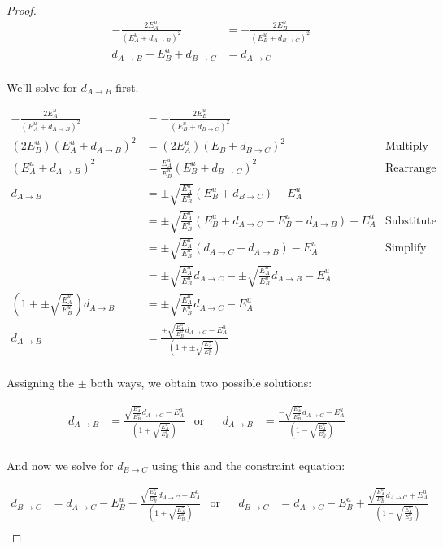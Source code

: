 \begin{proof}
	\begin{align*}
		-\frac{2 E^u_A}{(E^u_A+d_{A \to B})^2} &= -\frac{2 E^u_B}{(E^u_B+d_{B \to C})^2}\\
		d_{A \to B}+E^u_B+d_{B \to C} &= d_{A \to C}\\
	\end{align*}
	
	We'll solve for $d_{A \to B}$ first.
	
	\begin{align*}
		-\frac{2 E^u_A}{(E^u_A+d_{A \to B})^2} &= -\frac{2 E^u_B}{(E^u_B+d_{B \to C})^2} &\mbox{}&\\
		(2 E^u_B)(E^u_A+d_{A \to B})^2 &= (2 E^u_A)(E_B+d_{B \to C})^2 &\mbox{Multiply By -1 Then Cross Multiply}&\\
		(E^u_A+d_{A \to B})^2 &= \frac{E^u_A}{E^u_B}(E^u_B+d_{B \to C})^2 &\mbox{Rearrange and Simplify}&\\
		d_{A \to B} &= \pm\sqrt{\frac{E^u_A}{E^u_B}}(E^u_B+d_{B \to C})-E^u_A &\mbox{}&\\
		&= \pm\sqrt{\frac{E^u_A}{E^u_B}}(E^u_B+d_{A \to C}-E^u_B-d_{A \to B})-E^u_A &\mbox{Substitute From Constraint}&\\
		&= \pm\sqrt{\frac{E^u_A}{E^u_B}}(d_{A \to C}-d_{A \to B})-E^u_A &\mbox{Simplify}&\\
		&= \pm\sqrt{\frac{E^u_A}{E^u_B}}d_{A \to C}-\pm\sqrt{\frac{E^u_A}{E^u_B}}d_{A \to B}-E^u_A &\mbox{}&\\
		(1+\pm\sqrt{\frac{E^u_A}{E^u_B}})d_{A \to B}&= \pm\sqrt{\frac{E^u_A}{E^u_B}}d_{A \to C}-E^u_A &\mbox{}&\\
		d_{A \to B}&= \frac{\pm\sqrt{\frac{E^u_A}{E^u_B}}d_{A \to C}-E^u_A}{(1+\pm\sqrt{\frac{E^u_A}{E^u_B}})} &\mbox{}&\\
	\end{align*}
	
	Assigning the $\pm$ both ways, we obtain two possible solutions:
	
	\begin{align*}
		d_{A \to B}&= \frac{\sqrt{\frac{E^u_A}{E^u_B}}d_{A \to C}-E^u_A}{(1+\sqrt{\frac{E^u_A}{E^u_B}})} & \text{or} & & d_{A \to B}&= \frac{-\sqrt{\frac{E^u_A}{E^u_B}}d_{A \to C}-E^u_A}{(1-\sqrt{\frac{E^u_A}{E^u_B}})} &\\
	\end{align*}
	
	And now we solve for $d_{B \to C}$ using this and the constraint equation:
	
	\begin{align*}
		d_{B \to C}&= d_{A \to C} - E^u_B - \frac{\sqrt{\frac{E^u_A}{E^u_B}}d_{A \to C}-E^u_A}{(1+\sqrt{\frac{E^u_A}{E^u_B}})} & \text{or} & & d_{B \to C}&= d_{A \to C} - E^u_B + \frac{\sqrt{\frac{E^u_A}{E^u_B}}d_{A \to C}+E^u_A}{(1-\sqrt{\frac{E^u_A}{E^u_B}})} &\\
	\end{align*}
	

\end{proof}
